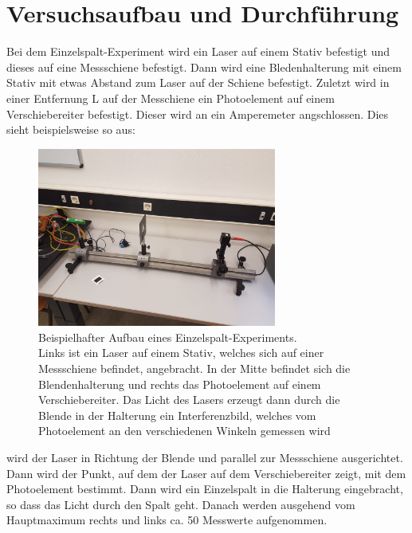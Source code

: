 \section{Versuchsaufbau und Durchführung}
Bei dem Einzelspalt-Experiment wird ein Laser auf einem Stativ befestigt und dieses auf 
eine Messschiene befestigt. Dann wird eine Bledenhalterung mit einem Stativ 
mit etwas Abstand zum Laser auf der Schiene befestigt. Zuletzt wird in einer Entfernung L auf der Messchiene
ein Photoelement auf einem Verschiebereiter befestigt. Dieser wird an ein Amperemeter
angschlossen. Dies sieht beispielsweise so aus:
\begin{figure}[H]
    \centering
    \includegraphics[width=0.7\textwidth]{images/aufbau.jpg}
    \caption{Beispielhafter Aufbau eines Einzelspalt-Experiments.\\
    Links ist ein Laser auf einem Stativ, welches sich auf einer Messschiene befindet, angebracht.
    In der Mitte befindet sich die Blendenhalterung und rechts das Photoelement auf einem 
    Verschiebereiter. Das Licht des Lasers erzeugt dann durch die Blende in der Halterung 
    ein Interferenzbild, welches vom Photoelement an den verschiedenen Winkeln gemessen wird
    }
    \label{fig:3}
\end{figure}
\justifying wird der Laser in Richtung der Blende und parallel zur Messschiene
ausgerichtet. Dann wird der Punkt, auf dem der Laser auf dem Verschiebereiter zeigt, mit dem
Photoelement bestimmt. Dann wird ein Einzelspalt in die Halterung eingebracht, so dass
das Licht durch den Spalt geht. Danach werden ausgehend vom Hauptmaximum rechts und links 
ca. 50 Messwerte aufgenommen.

